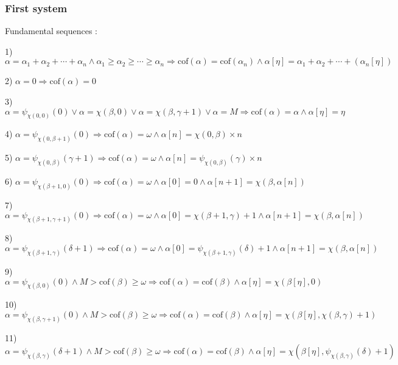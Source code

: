 \documentclass[10pt]{article}
\begin{document}
\subsubsection{First system}

Fundamental sequences :

\bigskip

1) \(\alpha=\alpha_1+\alpha_2+\cdots+\alpha_n \wedge \alpha_1\geq\alpha_2\geq\cdots\geq\alpha_n \Rightarrow \text{cof} (\alpha)= \text{cof} (\alpha_n) \wedge \alpha[\eta]=\alpha_1+\alpha_2+\cdots+(\alpha_n[\eta])\)

2) \(\alpha=0\Rightarrow\text{cof}(\alpha)=0\) 

\bigskip

3) \(\alpha=\psi _{\chi(0,0)}(0) \vee \alpha=\chi(\beta,0) \vee \alpha=\chi(\beta,\gamma+1) \vee \alpha=M\Rightarrow \text{cof} (\alpha)=\alpha \wedge \alpha[\eta]=\eta\)

4) \(\alpha=\psi _{\chi(0,\beta+1)}(0) \Rightarrow \text{cof}(\alpha)=\omega \wedge \alpha[n]=\chi(0,\beta)\times n\)

5) \(\alpha=\psi_{ \chi(0,\beta)}(\gamma+1) \Rightarrow \text{cof}(\alpha)=\omega \wedge \alpha[n]=\psi_{\chi(0,\beta)}(\gamma)\times n\)

\bigskip

6) \(\alpha=\psi _{\chi(\beta+1,0)}(0) \Rightarrow \text{cof}(\alpha)=\omega \wedge \alpha[0]=0 \wedge \alpha[n+1]=\chi(\beta,\alpha[n])\)

7) \(\alpha=\psi _{\chi(\beta+1,\gamma+1)}(0) \Rightarrow \text{cof}(\alpha)=\omega \wedge \alpha[0]=\chi(\beta+1,\gamma)+1 \wedge \alpha[n+1]=\chi(\beta,\alpha[n])\)

8) \(\alpha=\psi_{\chi(\beta+1,\gamma)}(\delta+1) \Rightarrow \text{cof}(\alpha)=\omega \wedge \alpha[0]= \psi_{\chi(\beta+1,\gamma)}(\delta)+1 \wedge \alpha[n+1]=\chi(\beta,\alpha[n])\)

\bigskip

9) \(\alpha=\psi _{\chi(\beta,0)}(0) \wedge M>\text{cof}(\beta)\geq\omega \Rightarrow \text{cof} (\alpha)= \text{cof} (\beta) \wedge \alpha[\eta]=\chi(\beta[\eta],0)\)

10) \(\alpha=\psi_{ \chi(\beta,\gamma+1)}(0) \wedge M>\text{cof}(\beta)\geq\omega \Rightarrow \text{cof}(\alpha)=\text{cof}(\beta)\wedge \alpha[\eta]=\chi(\beta[\eta],\chi(\beta,\gamma)+1)\)

11) \(\alpha=\psi_{ \chi(\beta,\gamma)}(\delta+1) \wedge M>\text{cof} (\beta)\geq\omega \Rightarrow \text{cof}(\alpha)=\text{cof}(\beta) \wedge \alpha[\eta]=\chi(\beta[\eta],\psi_{\chi(\beta,\gamma)}(\delta)+1)\)
\end{document}
